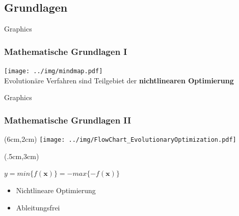 \subsection{Grundlagen}
\begin{frame}{Graphics} 
	\frametitle{Mathematische Grundlagen I }
	\centering
	\texttt{[image: ../img/mindmap.pdf]}\\
	\tiny Evolutionäre Verfahren sind Teilgebiet der \textbf{nichtlinearen Optimierung}
\end{frame}
\begin{frame}{Graphics} 
  	\frametitle{Mathematische Grundlagen II}
  	\begin{textblock*}{6cm}(6cm,2cm) %
   		\texttt{[image: ../img/FlowChart\_EvolutionaryOptimization.pdf]}
   	\end{textblock*}
%	
	\begin{textblock*}{5cm}(.5cm,3cm) %
		\small
   		\begin{ziel}
   		$ y=min\{f(\mathbf{x})\} = -max\{-f(\mathbf{x})\} $
   		\end{ziel}
%   		
		\begin{itemize}
		\item Nichtlineare Optimierung
		\item Ableitungsfrei
		\end{itemize}
   	\end{textblock*}
\end{frame}
